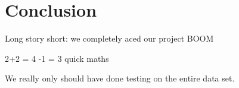 \section{Conclusion}
     \pagestyle{mario}

Long story short: we completely aced our project BOOM

2+2 = 4 -1 = 3 quick maths

We really only should have done testing on the entire data set.
